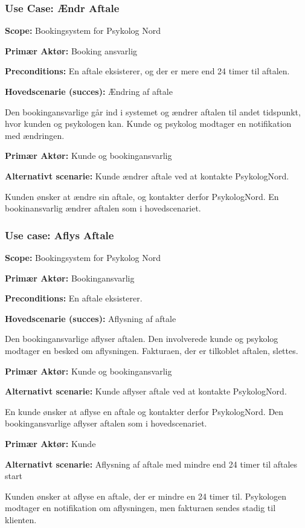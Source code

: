 \subsubsection{Use Case: Ændr Aftale}
{\setlength{\parindent}{0cm}
\textbf{Scope:} Bookingsystem for Psykolog Nord

\textbf{Primær Aktør:} Booking ansvarlig 

\textbf{Preconditions:} En aftale eksisterer, og der er mere end 24 timer til aftalen.

\textbf{Hovedscenarie (succes):} Ændring af aftale

Den bookingansvarlige går ind i systemet og ændrer aftalen til andet tidspunkt, hvor kunden og psykologen kan.
Kunde og psykolog modtager en notifikation med ændringen.

\textbf{Primær Aktør:} Kunde og bookingansvarlig

\textbf{Alternativt scenarie:} Kunde ændrer aftale ved at kontakte PsykologNord.

Kunden ønsker at ændre sin aftale, og kontakter derfor PsykologNord.
En bookinansvarlig ændrer aftalen som i hovedscenariet.
}

\subsubsection{Use case: Aflys Aftale}
{\setlength{\parindent}{0cm}
\textbf{Scope:} Bookingsystem for Psykolog Nord

\textbf{Primær Aktør:} Bookingansvarlig

\textbf{Preconditions:} En aftale eksisterer.

\textbf{Hovedscenarie (succes):} Aflysning af aftale

Den bookingansvarlige aflyser aftalen.
Den involverede kunde og psykolog modtager en besked om aflysningen. Fakturaen, der er tilkoblet aftalen, slettes.

\textbf{Primær Aktør:} Kunde og bookingansvarlig

\textbf{Alternativt scenarie:} Kunde aflyser aftale ved at kontakte PsykologNord.

En kunde ønsker at aflyse en aftale og kontakter derfor PsykologNord.
Den bookingansvarlige aflyser aftalen som i hovedscenariet.

\textbf{Primær Aktør:} Kunde

\textbf{Alternativt scenarie:} Aflysning af aftale med mindre end 24 timer til aftales start

Kunden ønsker at aflyse en aftale, der er mindre en 24 timer til.
Psykologen modtager en notifikation om aflysningen, men fakturaen sendes stadig til klienten.
}

